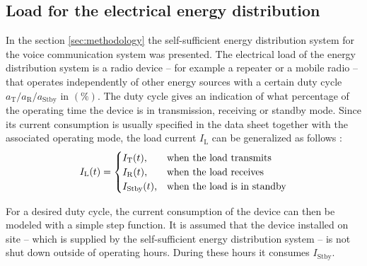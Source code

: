 \subsection{Load for the electrical energy distribution} \label{sec:load_radio}
In the section \ref{sec:methodology} the self-sufficient energy distribution system for the voice communication system was presented. The electrical load of the energy distribution system is a radio device -- for example a repeater or a mobile radio -- that operates independently of other energy sources with a certain duty cycle $a_\mathrm{T}/a_\mathrm{R}/a_\mathrm{Stby}$ in $\left(\%\right)$. The duty cycle gives an indication of what percentage of the operating time the device is in transmission, receiving or standby mode. Since its current consumption is usually specified in the data sheet together with the associated operating mode, the load current $I_\mathrm{L}$ can be generalized as follows \cite{DM2600:2013, SLR1000:2019}: 
\begin{equation} \label{eq:battery_current}
	\centering
	I_\mathrm{L}(t) =
  	\begin{cases}
   		I_\mathrm{T}(t)\text{,} & \text{when the load transmits} \\
    	I_\mathrm{R}(t)\text{,} & \text{when the load receives} \\
		I_\mathrm{Stby}(t)\text{,} & \text{when the load is in standby}
 	\end{cases}
\end{equation}  

For a desired duty cycle, the current consumption of the device can then be modeled with a simple step function. It is assumed that the device installed on site -- which is supplied by the self-sufficient energy distribution system -- is not shut down outside of operating hours. During these hours it consumes $I_\mathrm{Stby}$. 